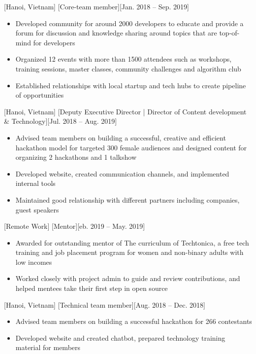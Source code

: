 \documentclass{article}
\begin{document}
[Hanoi, Vietnam]
[Core-team member][Jan. 2018 – Sep. 2019]

\begin{itemize}
\item Developed community for around 2000 developers to educate and provide a forum for discussion and
knowledge sharing around topics that are top-of-mind for developers
\item Organized 12 events with more than 1500 attendees such as workshops, training sessions, master
classes, community challenges and algorithm club
\item Established relationships with local startup and tech hubs to create pipeline of opportunities
\end{itemize}

[Hanoi, Vietnam]
[Deputy Executive Director | Director of Content development \& Technology][Jul. 2018 – Aug. 2019]

\begin{itemize}
\item Advised team members on building a successful, creative and efficient hackathon model for targeted
300 female audiences and designed content for organizing 2 hackathons and 1 talkshow
\item Developed website, created communication channels, and implemented internal tools
\item Maintained good relationship with different partners including companies, guest speakers
\end{itemize}

[Remote Work]
[Mentor][eb. 2019 – May. 2019]

\begin{itemize}
\item Awarded for outstanding mentor of The curriculum of Techtonica, a free tech training and job
placement program for women and non-binary adults with low incomes
\item Worked closely with project admin to guide and review contributions, and helped mentees take their
first step in open source
\end{itemize}

[Hanoi, Vietnam]
[Technical team member][Aug. 2018 – Dec. 2018]

\begin{itemize}
\item Advised team members on building a successful hackathon for 266 contestants
\item Developed website and created chatbot, prepared technology training material for members
\end{itemize}
\end{document}
